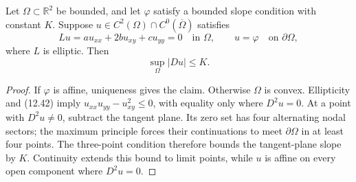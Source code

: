 \begin{lemma}
\label{gt-ch12-lem-bounded-slope-gradient}
Let $\Omega\subset\mathbb R^2$ be bounded, and let
$\varphi$ satisfy a bounded slope condition with constant $K$.  Suppose
$u\in C^2(\Omega)\cap C^0(\overline\Omega)$ satisfies
\begin{equation}\tag{12.42}
Lu=au_{xx}+2bu_{xy}+cu_{yy}=0
\quad\text{in }\Omega,
\qquad u=\varphi\quad\text{on }\partial\Omega,
\end{equation}
where $L$ is elliptic.  Then
\begin{equation}\tag{12.43}
\sup_\Omega|Du|\le K.
\end{equation}
\end{lemma}
\begin{proof}
\sketch If $\varphi$ is affine, uniqueness gives the claim.  Otherwise
$\Omega$ is convex.  Ellipticity and (12.42) imply
$u_{xx}u_{yy}-u_{xy}^2\le0$, with equality only where $D^2u=0$.
At a point with $D^2u\ne0$, subtract the tangent plane.  Its zero set has
four alternating nodal sectors; the maximum principle forces their
continuations to meet $\partial\Omega$ in at least four points.  The
three-point condition therefore bounds the tangent-plane slope by $K$.
Continuity extends this bound to limit points, while $u$ is affine on every
open component where $D^2u=0$.
\end{proof}

